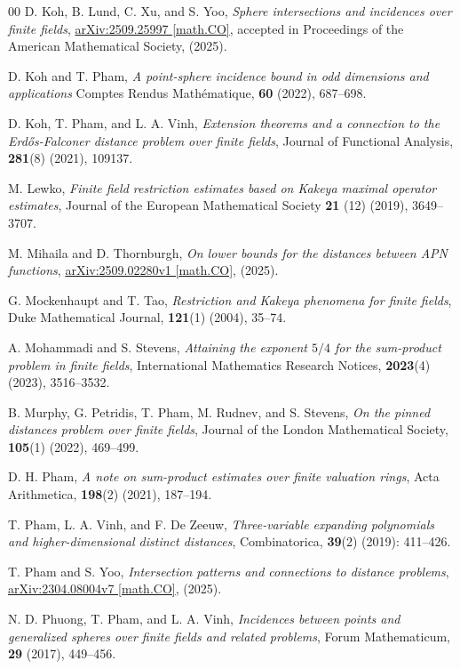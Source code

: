 \documentclass{article}
\begin{document}
\begin{thebibliography}{00}
D. Koh, B. Lund, C. Xu, and S. Yoo, 
\textit{Sphere intersections and incidences over finite fields}, \href{https://arxiv.org/abs/2509.25997}{arXiv:2509.25997 [math.CO]}, accepted in Proceedings of the American Mathematical Society, (2025).

D. Koh and T. Pham, \textit{A point-sphere incidence bound in odd dimensions and applications} Comptes Rendus Math\'ematique, \textbf{60} (2022), 687--698.


 D. Koh, T. Pham, and L. A. Vinh, \textit{Extension theorems and a connection to the Erd\H{o}s-Falconer distance problem over finite fields}, Journal of Functional Analysis, \textbf{281}(8) (2021), 109137.


M. Lewko, \textit{Finite field restriction estimates based on Kakeya maximal operator estimates}, Journal of the European Mathematical Society \textbf{21} (12) (2019), 3649--3707.

 M. Mihaila and D. Thornburgh, \textit{On lower bounds for the distances between APN functions}, \href{https://arxiv.org/abs/2509.02280}{arXiv:2509.02280v1 [math.CO]}, (2025).%


 G. Mockenhaupt and T. Tao, \emph{Restriction and Kakeya phenomena for  finite fields}, Duke Mathematical Journal, \textbf{121}(1) (2004), 35--74.

A. Mohammadi and S. Stevens, \textit{Attaining the exponent $5/4$ for the sum-product problem in finite fields}, International Mathematics Research Notices, \textbf{2023}(4) (2023), 3516--3532.


B. Murphy, G. Petridis, T. Pham, M. Rudnev, and S. Stevens, \textit{On the pinned distances problem over finite fields}, Journal of the London Mathematical Society, \textbf{105}(1) (2022), 469--499.

D. H. Pham, \textit{A note on sum-product estimates over finite valuation rings}, Acta Arithmetica, \textbf{198}(2) (2021), 187--194.


T. Pham, L. A. Vinh, and F. De Zeeuw, \textit{Three-variable expanding polynomials and higher-dimensional distinct distances}, Combinatorica, \textbf{39}(2) (2019): 411--426.

T. Pham and S. Yoo, \textit{Intersection patterns and connections to distance problems}, \href{https://arxiv.org/abs/2304.08004v7}{arXiv:2304.08004v7 [math.CO]}, (2025).

N. D. Phuong, T. Pham, and L. A. Vinh, \textit{Incidences between points and generalized spheres over finite fields and related problems}, Forum Mathematicum, \textbf{29} (2017), 449--456.


\end{thebibliography}
\end{document}
